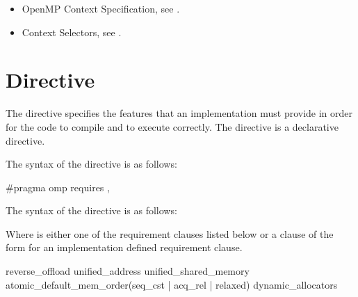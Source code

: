 \crossreferences
\begin{itemize}
\item OpenMP Context Specification, see .

\item Context Selectors, see .
\end{itemize}



\section{ Directive}
\label{sec:requires Directive}

\summary The  directive specifies the features that an implementation
must provide in order for the code to compile and to execute correctly.
The  directive is a declarative directive.

\syntax
\begin{ccppspecific}
  The syntax of the  directive is as follows:

\begin{ompcPragma}
  #pragma omp requires \plc{clause[ [ [},\plc{] clause] ... ] new-line}

\end{ompcPragma}

\end{ccppspecific}

\begin{fortranspecific}
  The syntax of the  directive is as follows:


\end{fortranspecific}

Where  is either one of the requirement clauses listed below or a
clause of the form {} for an
implementation defined requirement clause.

\begin{indentedcodelist}
reverse_offload
unified_address
unified_shared_memory
atomic_default_mem_order(seq_cst \textnormal{|} acq_rel \textnormal{|} relaxed)
dynamic_allocators
\end{indentedcodelist}

